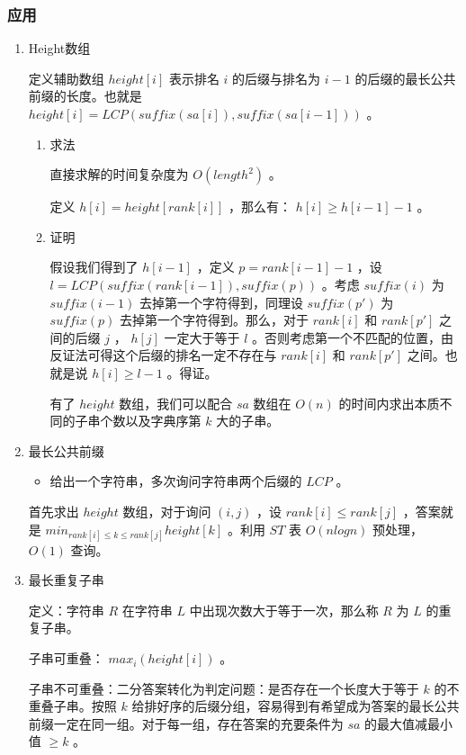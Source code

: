 \documentclass[11pt]{article}
\begin{document}
\subsubsection{应用}
\label{sec-5-3-3}
\begin{enumerate}
\item Height数组
\label{sec-5-3-3-1}

定义辅助数组 $height[i]$ 表示排名 $i$ 的后缀与排名为 $i-1$ 的后缀的最长公共前缀的长度。也就是 $height[i]=LCP(suffix(sa[i]),suffix(sa[i-1]))$ 。

\begin{enumerate}
\item 求法
\label{sec-5-3-3-1-1}

直接求解的时间复杂度为 $O(length^2)$ 。

定义 $h[i]=height[rank[i]]$ ，那么有： $h[i] \geq h[i-1]-1$ 。

\item 证明
\label{sec-5-3-3-1-2}

假设我们得到了 $h[i-1]$ ，定义 $p=rank[i-1]-1$ ，设 $l=LCP(suffix(rank[i-1]),suffix(p))$ 。考虑 $suffix(i)$ 为 $suffix(i-1)$ 去掉第一个字符得到，同理设 $suffix(p')$ 为 $suffix(p)$ 去掉第一个字符得到。那么，对于 $rank[i]$ 和 $rank[p']$ 之间的后缀 $j$ ， $h[j]$ 一定大于等于 $l$ 。否则考虑第一个不匹配的位置，由反证法可得这个后缀的排名一定不存在与 $rank[i]$ 和 $rank[p']$ 之间。也就是说 $h[i] \geq l-1$ 。得证。

有了 $height$ 数组，我们可以配合 $sa$ 数组在 $O(n)$ 的时间内求出本质不同的子串个数以及字典序第 $k$ 大的子串。
\end{enumerate}

\item 最长公共前缀
\label{sec-5-3-3-2}

\begin{itemize}
\item 给出一个字符串，多次询问字符串两个后缀的 $LCP$ 。
\end{itemize}

首先求出 $height$ 数组，对于询问 $(i,j)$ ，设 $rank[i]\leq rank[j]$  ，答案就是 $min_{rank[i]\leq k \leq rank[j]}height[k]$  。利用 $ST$ 表 $O(nlogn)$ 预处理， $O(1)$ 查询。

\item 最长重复子串
\label{sec-5-3-3-3}

定义：字符串 $R$ 在字符串 $L$ 中出现次数大于等于一次，那么称 $R$ 为 $L$ 的重复子串。

子串可重叠： $max_i(height[i])$ 。

子串不可重叠：二分答案转化为判定问题：是否存在一个长度大于等于 $k$ 的不重叠子串。按照 $k$ 给排好序的后缀分组，容易得到有希望成为答案的最长公共前缀一定在同一组。对于每一组，存在答案的充要条件为 $sa$ 的最大值减最小值 $\geq k$ 。


\end{enumerate}
\end{document}
